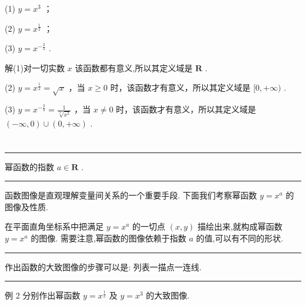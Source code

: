 \documentclass[10pt]{article}
\newcommand{\HRule}{\begin{center}\rule{0.9\linewidth}{0.2mm}\end{center}}
\begin{document}
(1) \(y = {x}^{3}\) ；

(2) \(y = {x}^{\frac{1}{2}}\) ；

(3) \(y = {x}^{-\frac{2}{3}}\) .

解(1)对一切实数 \(x\) 该函数都有意义,所以其定义域是 \(\mathbf{R}\) .

(2) \(y = {x}^{\frac{1}{2}} = \sqrt{x}\) ，当 \(x \geq  0\) 时，该函数才有意义，所以其定义域是 \(\lbrack 0, + \infty )\) .

(3) \(y = {x}^{-\frac{2}{3}} = \frac{1}{\sqrt[3]{{x}^{2}}}\) ，当 \(x \neq  0\) 时，该函数才有意义，所以其定义域是 \(\left( {-\infty ,0}\right)  \cup  \left( {0, + \infty }\right)\) .

\section*{}

\HRule

幂函数的指数 \(a \in  \mathbf{R}\) .

\HRule



函数图像是直观理解变量间关系的一个重要手段. 下面我们考察幂函数 \(y = {x}^{a}\) 的图像及性质.

在平面直角坐标系中把满足 \(y = {x}^{a}\) 的一切点 \(\left( {x,y}\right)\) 描绘出来,就构成幂函数 \(y = {x}^{a}\) 的图像. 需要注意,幂函数的图像依赖于指数 \(a\) 的值,可以有不同的形状.

\HRule

作出函数的大致图像的步骤可以是: 列表一描点一连线.

\HRule

\begin{center}
\end{center}

例 2 分别作出幂函数 \(y = {x}^{\frac{1}{2}}\) 及 \(y = {x}^{3}\) 的大致图像.
\end{document}
